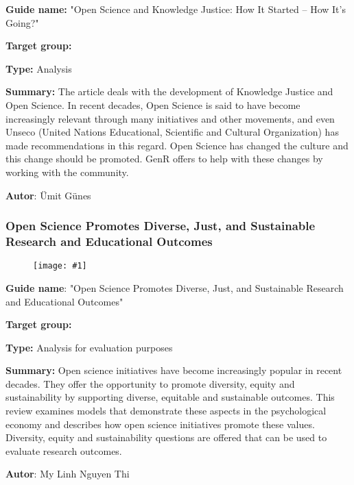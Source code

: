 \documentclass{article}
\newlength{\imgwidth}
\newcommand\scaledgraphics[2]{%
                
\settowidth{\imgwidth}{\texttt{[image: \#1]}}%
                
\setlength{\imgwidth}{\minof{\imgwidth}{#2\textwidth}}%
                
\texttt{[image: \#1]}%
                
}
\begin{document}
\textbf{Guide name:} "Open Science and Knowledge Justice: How It Started – How It’s Going?" \autocite{noauthor_open_2021}


\textbf{Target group:}


\textbf{Type:} Analysis


\textbf{Summary:} The article deals with the development of Knowledge Justice and Open Science. In recent decades, Open Science is said to have become increasingly relevant through many initiatives and other movements, and even Unseco (United Nations Educational, Scientific and Cultural Organization) has made recommendations in this regard. Open Science has changed the culture and this change should be promoted. GenR offers to help with these changes by working with the community.


\textbf{Autor}: Ümit Günes


\subsubsection{Open Science Promotes Diverse, Just, and Sustainable Research and Educational Outcomes}\label{H4807510}


\begin{figure}
\scaledgraphics{23f9ee73-dda2-4a56-8083-4a618f9983b9.png}{1}
\label{F46402811}
\end{figure}





\textbf{Guide name}: "Open Science Promotes Diverse, Just, and Sustainable Research and Educational Outcomes" \autocite{grahe_open_2019}


\textbf{Target group:}


\textbf{Type: }Analysis for evaluation purposes


\textbf{Summary:} Open science initiatives have become increasingly popular in recent decades. They offer the opportunity to promote diversity, equity and sustainability by supporting diverse, equitable and sustainable outcomes. This review examines models that demonstrate these aspects in the psychological economy and describes how open science initiatives promote these values. Diversity, equity and sustainability questions are offered that can be used to evaluate research outcomes.


\textbf{Autor}: My Linh Nguyen Thi


\printbibliography[title={Bibliography}]
\end{document}
